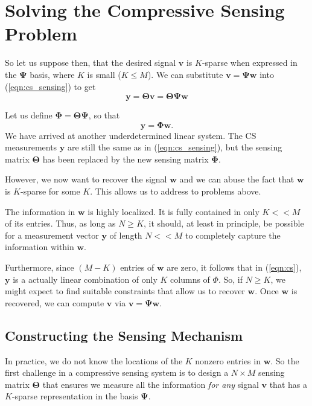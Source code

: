 \section{Solving the Compressive Sensing Problem}
So let us suppose then, that the desired signal $\bm v$ is $K$-sparse when expressed in the $\bm\Psi$ basis, where $K$ is small ($K\leq M$).
We can substitute $\bm v = \bm\Psi\bm w$ into (\ref{eqn:cs_sensing}) to get
\begin{equation*}
  \bm y = \bm\Theta\bm v = \bm\Theta\bm\Psi\bm w
\end{equation*}

Let us define $\bm\Phi = \bm\Theta\bm\Psi$, so that
\begin{equation}
  \label{eqn:cs}
  \bm y = \bm\Phi\bm w .
\end{equation}
We have arrived at another underdetermined linear system.
The CS measurements $\bm y$ are still the same as in (\ref{eqn:cs_sensing}), but the sensing matrix $\bm\Theta$ has been replaced by the new sensing matrix $\bm\Phi$.

However, we now want to recover the signal $\bm w$ and we can abuse the fact that $\bm w$ is $K$-sparse for some $K$.
This allows us to address to problems  above.

The information in $\bm w$ is highly localized.
It is fully contained in only $K << M$ of its entries.
Thus, as long as $N\geq K$, it should, at least in principle, be possible for a measurement vector $\bm y$ of length $N<<M$ to completely capture the information within $\bm w$.

Furthermore, since $(M-K)$ entries of $\bm w$ are zero, it follows that in (\ref{eqn:cs}), $\bm y$ is a actually linear combination of only $K$ columns of $\Phi$. 
So, if $N\geq K$, we might expect to find suitable constraints that allow us to recover $\bm w$.
Once $\bm w$ is recovered, we can compute $\bm v$ via $\bm v = \bm\Psi\bm w$.

\subsection{Constructing the Sensing Mechanism}
In practice, we do not know the locations of the $K$ nonzero entries in $\bm w$.
So the first challenge in a compressive sensing system is to design a $N\times M$ sensing matrix $\bm\Theta$ that ensures we measure all the information \emph{for any} signal $\bm v$ that has a $K$-sparse representation in the basis $\bm\Psi$.

